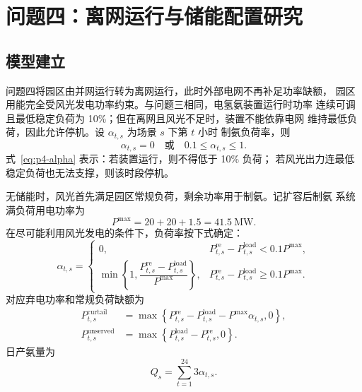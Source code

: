 \section{问题四：离网运行与储能配置研究}

\subsection{模型建立}

问题四将园区由并网运行转为离网运行，此时外部电网不再补足功率缺额，
园区用能完全受风光发电功率约束。与问题三相同，电氢氨装置运行时功率
连续可调且最低稳定负荷为 10\%；但在离网且风光不足时，装置不能依靠电网
维持最低负荷，因此允许停机。设 $\alpha_{t,s}$ 为场景 $s$ 下第 $t$ 小时
制氨负荷率，则
\begin{equation}
  \alpha_{t,s}=0
  \quad\text{或}\quad
  0.1\leq\alpha_{t,s}\leq1.
  \label{eq:p4-alpha}
\end{equation}
式~\eqref{eq:p4-alpha} 表示：若装置运行，则不得低于 10\% 负荷；
若风光出力连最低稳定负荷也无法支撑，则该时段停机。

无储能时，风光首先满足园区常规负荷，剩余功率用于制氨。记扩容后制氨
系统满负荷用电功率为
\begin{equation}
  P^{\max}=20+20+1.5=41.5~\mathrm{MW}.
  \label{eq:p4-pmax}
\end{equation}
在尽可能利用风光发电的条件下，负荷率按下式确定：
\begin{equation}
  \alpha_{t,s}=
  \begin{cases}
    0, &
    P_{t,s}^{\mathrm{re}}-P_{t,s}^{\mathrm{load}} < 0.1P^{\max},\\[2mm]
    \min\left\{1,\dfrac{P_{t,s}^{\mathrm{re}}-P_{t,s}^{\mathrm{load}}}{P^{\max}}\right\}, &
    P_{t,s}^{\mathrm{re}}-P_{t,s}^{\mathrm{load}} \geq 0.1P^{\max}.
  \end{cases}
  \label{eq:p4-no-storage-alpha}
\end{equation}
对应弃电功率和常规负荷缺额为
\begin{align}
  P_{t,s}^{\mathrm{curtail}}
  &=\max\left\{P_{t,s}^{\mathrm{re}}-P_{t,s}^{\mathrm{load}}
  -P^{\max}\alpha_{t,s},0\right\},\\
  P_{t,s}^{\mathrm{unserved}}
  &=\max\left\{P_{t,s}^{\mathrm{load}}-P_{t,s}^{\mathrm{re}},0\right\}.
  \label{eq:p4-curtail-unserved}
\end{align}
日产氨量为
\begin{equation}
  Q_s=\sum_{t=1}^{24}3\alpha_{t,s}.
  \label{eq:p4-production}
\end{equation}

